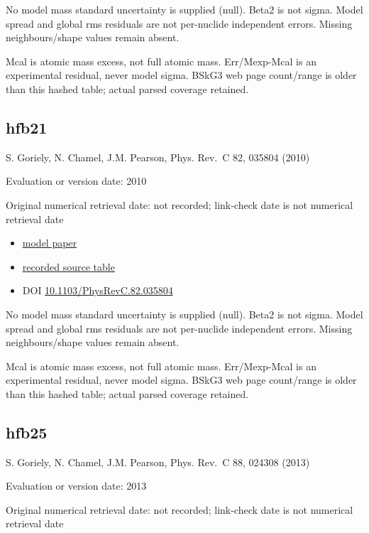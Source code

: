 \documentclass[
  11pt,
  letterpaper,
]{article}
\providecommand{\tightlist}{%
  \setlength{\itemsep}{0pt}\setlength{\parskip}{0pt}}
\begin{document}
No model mass standard uncertainty is supplied (null). Beta2 is not
sigma. Model spread and global rms residuals are not per-nuclide
independent errors. Missing neighbours/shape values remain absent.

Mcal is atomic mass excess, not full atomic mass. Err/Mexp-Mcal is an
experimental residual, never model sigma. BSkG3 web page count/range is
older than this hashed table; actual parsed coverage retained.

\subsection{hfb21}\label{hfb21}

S. Goriely, N. Chamel, J.M. Pearson, Phys. Rev.~C 82, 035804 (2010)

Evaluation or version date: 2010

Original numerical retrieval date: not recorded; link-check date is not
numerical retrieval date

\begin{itemize}
\tightlist
\item
  \href{https://doi.org/10.1103/PhysRevC.82.035804}{model paper}
\item
  \href{https://www.astro.ulb.ac.be/bruslib/nucdata/hfb21-dat}{recorded
  source table}
\item
  DOI
  \href{https://doi.org/10.1103/PhysRevC.82.035804}{10.1103/PhysRevC.82.035804}
\end{itemize}

No model mass standard uncertainty is supplied (null). Beta2 is not
sigma. Model spread and global rms residuals are not per-nuclide
independent errors. Missing neighbours/shape values remain absent.

Mcal is atomic mass excess, not full atomic mass. Err/Mexp-Mcal is an
experimental residual, never model sigma. BSkG3 web page count/range is
older than this hashed table; actual parsed coverage retained.

\subsection{hfb25}\label{hfb25}

S. Goriely, N. Chamel, J.M. Pearson, Phys. Rev.~C 88, 024308 (2013)

Evaluation or version date: 2013

Original numerical retrieval date: not recorded; link-check date is not
numerical retrieval date
\end{document}
